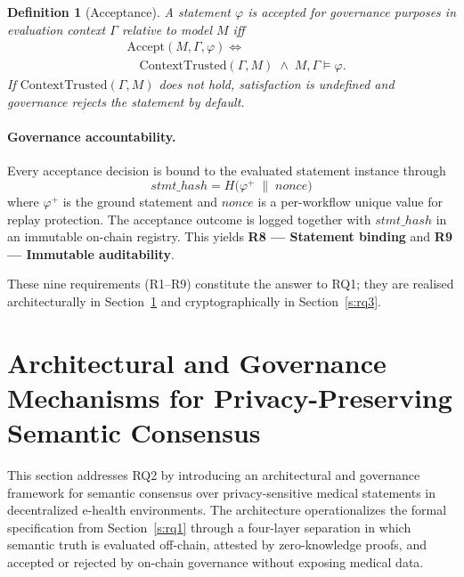 \documentclass[journal]{IEEEtran}
\newtheorem{definition}{Definition}
\begin{document}
\begin{definition}[Acceptance]
\label{def:acceptance}
A statement $\varphi$ is accepted for governance purposes in evaluation context $\Gamma$ relative to model $M$ iff
\begin{equation}
\begin{aligned}
  & \mathrm{Accept}(M, \Gamma, \varphi) \iff \\
  & \quad \mathrm{ContextTrusted}(\Gamma, M)
  \;\wedge\; M, \Gamma \models \varphi.
\end{aligned}
\label{eq:accept}
\end{equation}
If $\mathrm{ContextTrusted}(\Gamma, M)$ does not hold, satisfaction is undefined and governance rejects the statement by default.
\end{definition}

\paragraph{Governance accountability.}
Every acceptance decision is bound to the evaluated statement instance through
\begin{equation}
  \mathit{stmt\_hash}
  = H\!\bigl(\varphi^{+} \;\|\; \mathit{nonce}\bigr)
\label{eq:stmt-hash}
\end{equation}
where $\varphi^{+}$ is the ground statement and $\mathit{nonce}$ is a per-workflow unique value for replay protection. The acceptance outcome is logged together with $\mathit{stmt\_hash}$ in an immutable on-chain registry. This yields \textbf{R8 --- Statement binding} and \textbf{R9 --- Immutable auditability}.

These nine requirements (R1--R9) constitute the answer to RQ1; they are realised architecturally in Section~\ref{s:rq2} and cryptographically in Section~\ref{s:rq3}.





\section{Architectural and Governance Mechanisms for Privacy-Preserving Semantic Consensus}
\label{s:rq2}

This section addresses RQ2 by introducing an architectural and governance framework for semantic consensus over privacy-sensitive medical statements in decentralized e-health environments. The architecture operationalizes the formal specification from Section~\ref{s:rq1} through a four-layer separation in which semantic truth is evaluated off-chain, attested by zero-knowledge proofs, and accepted or rejected by on-chain governance without exposing medical data.
\end{document}
